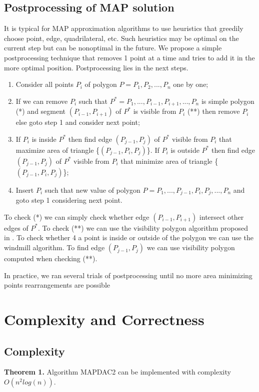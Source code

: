 \documentclass[conference]{IEEEtran}
\begin{document}
		\subsection{Postprocessing of MAP solution}
			It is typical for MAP approximation algorithms to use heuristics that greedily choose point, edge, quadrilateral, etc.
			Such heuristics may be optimal on the current step but can be nonoptimal in the future.
			We propose a simple postprocessing technique that removes 1 point at a time and tries to add it in the more optimal position.
			Postprocessing lies in the next steps.
			\begin{enumerate}
				\item Consider all points $P_{i}$ of polygon $P = P_{1}, P_{2}, ..., P_{n}$ one by one;
				\item If we can remove $P_{i}$ such that $P^{*} = P_{1}, ..., P_{i-1}, P_{i+1}, ..., P_{n}$ is simple polygon (*) 
				and segment $(P_{i-1}, P_{i+1})$ of $P^{*}$ is visible from $P_{i}$ (**) 
				then remove $P_{i}$ else goto step 1 and consider next point;
				\item If $P_{i}$ is inside $P^{*}$ then find edge $(P_{j-1}, P_{j})$ of $P^{*}$ visible from $P_{i}$ that maximize area of triangle \{$(P_{j-1}, P_{i}, P_{j})$\}. 
				If $P_{i}$ is outside  $P^{*}$ then find edge $(P_{j-1}, P_{j})$ of $P^{*}$ visible from $P_{i}$ that minimize area of triangle \{$(P_{j-1}, P_{i}, P_{j})$\};
				\item Insert $P_{i}$ such that new value of polygon $P = P_{1}, ..., P_{j-1}, P_{i}, P_{j}, ..., P_{n}$ and goto step 1 considering next point.
			\end{enumerate}
			
			To check (*) we can simply check whether edge $(P_{i-1}, P_{i+1})$ intersect other edges of $P^{*}$.
			To check (**) we can use the visibility polygon algorithm proposed in \cite{link14}.
			To check whether 4 a point is inside or outside of the polygon we can use the windmill algorithm.
			To find edge $(P_{j-1}, P_{j})$ we can use visibility polygon computed when checking (**).
			
			In practice, we ran several trials of postprocessing until no more area minimizing points rearrangements are possible
	
	\section {Complexity and Correctness}
	\label{S3}
		\subsection {Complexity}
			\textbf{Theorem 1.}
			Algorithm MAP{\textunderscore}DAC2 can be implemented with complexity $O(n^{2}log(n))$.
			
\end{document}
